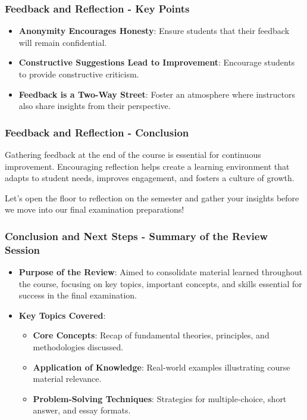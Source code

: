 \documentclass[aspectratio=169]{beamer}
\begin{document}
\begin{frame}[fragile]
    \frametitle{Feedback and Reflection - Key Points}
    \begin{itemize}
        \item \textbf{Anonymity Encourages Honesty}: Ensure students that their feedback will remain confidential.
        \item \textbf{Constructive Suggestions Lead to Improvement}: Encourage students to provide constructive criticism.
        \item \textbf{Feedback is a Two-Way Street}: Foster an atmosphere where instructors also share insights from their perspective.
    \end{itemize}
\end{frame}

\begin{frame}[fragile]
    \frametitle{Feedback and Reflection - Conclusion}
    Gathering feedback at the end of the course is essential for continuous improvement. Encouraging reflection helps create a learning environment that adapts to student needs, improves engagement, and fosters a culture of growth. 

    Let’s open the floor to reflection on the semester and gather your insights before we move into our final examination preparations!
\end{frame}

\begin{frame}[fragile]
    \frametitle{Conclusion and Next Steps - Summary of the Review Session}
    \begin{itemize}
        \item \textbf{Purpose of the Review}: 
        Aimed to consolidate material learned throughout the course, focusing on key topics, important concepts, and skills essential for success in the final examination.
        
        \item \textbf{Key Topics Covered}:
            \begin{itemize}
                \item \textbf{Core Concepts}: Recap of fundamental theories, principles, and methodologies discussed.
                \item \textbf{Application of Knowledge}: Real-world examples illustrating course material relevance.
                \item \textbf{Problem-Solving Techniques}: Strategies for multiple-choice, short answer, and essay formats.
            \end{itemize}
    \end{itemize}
\end{frame}
\end{document}
